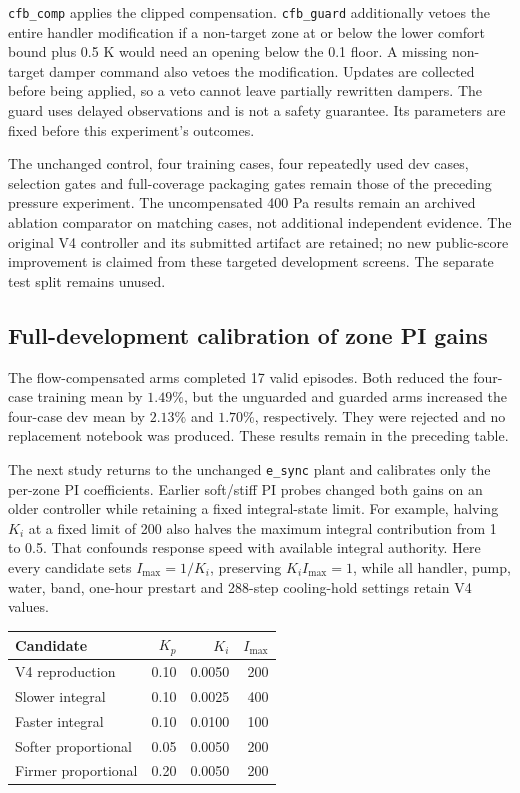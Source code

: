 \texttt{cfb\_comp} applies the clipped compensation. \texttt{cfb\_guard}
additionally vetoes the entire handler modification if a non-target zone at
or below the lower comfort bound plus 0.5 K would need an opening below the
0.1 floor. A missing non-target damper command also vetoes the modification.
Updates are collected before being applied, so a veto cannot leave partially
rewritten dampers. The guard uses delayed observations and is not a safety
guarantee. Its parameters are fixed before this experiment's outcomes.

The unchanged control, four training cases, four repeatedly used dev cases,
selection gates and full-coverage packaging gates remain those of the preceding
pressure experiment. The uncompensated 400 Pa results remain an archived
ablation comparator on matching cases, not additional independent evidence.
The original V4 controller and its submitted artifact are retained; no new
public-score improvement is claimed from these targeted development screens.
The separate test split remains unused.



\subsection{Full-development calibration of zone PI gains}
The flow-compensated arms completed 17 valid episodes. Both reduced the
four-case training mean by $1.49\%$, but the unguarded and guarded arms
increased the four-case dev mean by $2.13\%$ and $1.70\%$, respectively.
They were rejected and no replacement notebook was produced. These results
remain in the preceding table.

The next study returns to the unchanged \texttt{e\_sync} plant and calibrates
only the per-zone PI coefficients. Earlier soft/stiff PI probes changed both
gains on an older controller while retaining a fixed integral-state limit.
For example, halving $K_i$ at a fixed limit of 200 also halves the maximum
integral contribution from 1 to 0.5. That confounds response speed with
available integral authority. Here every candidate sets
$I_{\max}=1/K_i$, preserving $K_i I_{\max}=1$, while all handler, pump, water,
band, one-hour prestart and 288-step cooling-hold settings retain V4 values.

\begin{center}\small
\begin{tabular}{lrrr}\toprule
Candidate & $K_p$ & $K_i$ & $I_{\max}$ \\\midrule
V4 reproduction & 0.10 & 0.0050 & 200 \\
Slower integral & 0.10 & 0.0025 & 400 \\
Faster integral & 0.10 & 0.0100 & 100 \\
Softer proportional & 0.05 & 0.0050 & 200 \\
Firmer proportional & 0.20 & 0.0050 & 200 \\
\bottomrule\end{tabular}\end{center}

